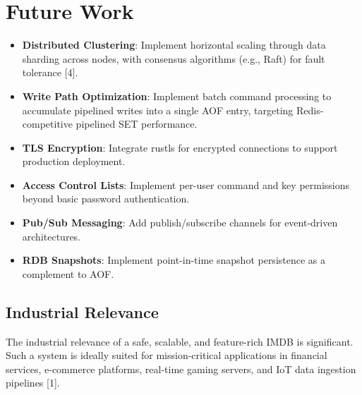 \documentclass[12pt,a4paper]{report}
\begin{document}
\section{Future Work}

\begin{itemize}[leftmargin=2.5em]
    \item \textbf{Distributed Clustering}: Implement horizontal scaling through data sharding across nodes, with consensus algorithms (e.g., Raft) for fault tolerance [4].
    \item \textbf{Write Path Optimization}: Implement batch command processing to accumulate pipelined writes into a single AOF entry, targeting Redis-competitive pipelined SET performance.
    \item \textbf{TLS Encryption}: Integrate rustls for encrypted connections to support production deployment.
    \item \textbf{Access Control Lists}: Implement per-user command and key permissions beyond basic password authentication.
    \item \textbf{Pub/Sub Messaging}: Add publish/subscribe channels for event-driven architectures.
    \item \textbf{RDB Snapshots}: Implement point-in-time snapshot persistence as a complement to AOF.
\end{itemize}

\subsection{Industrial Relevance}

The industrial relevance of a safe, scalable, and feature-rich IMDB is significant. Such a system is ideally suited for mission-critical applications in financial services, e-commerce platforms, real-time gaming servers, and IoT data ingestion pipelines [1].
\end{document}
